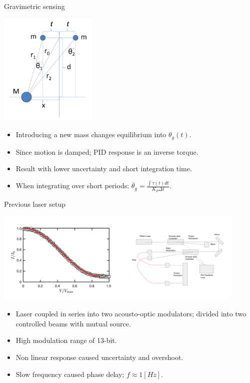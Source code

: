 \documentclass{beamer}
\begin{document}
\begin{frame}{\hypertarget{frame:Gravimetric sensing}{Gravimetric sensing}}
	\begin{center}		
		\includegraphics[width=0.35\textwidth,keepaspectratio]{Cavendish apparatus.PNG}
    \end{center}
	\begin{itemize}
		
		\item Introducing a new mass changes equilibrium into $\theta_g(t)$. 
		\item Since motion is damped; PID response is an inverse torque. 
		\item Result with lower uncertainty and short integration time.
		\item When integrating over short periods: $\overline{\theta}_g =  \frac{\int \tau(t) dt}{ K_P \Delta t} $. 	

	\end{itemize}
\end{frame}


\begin{frame}{Previous laser setup}
	\begin{center}		
		\includegraphics[width=0.9\textwidth,keepaspectratio]{aom2.png}
	\end{center}
	\begin{itemize}		
		\item Laser coupled in series into two acousto-optic modulators; divided into two controlled beams with mutual source.
		\item High modulation range of 13-bit.
		\item Non linear response caused uncertainty and overshoot.
		\item Slow frequency caused phase delay; $f \approx 1 [Hz]$.
	\end{itemize}
\end{frame}
\end{document}
